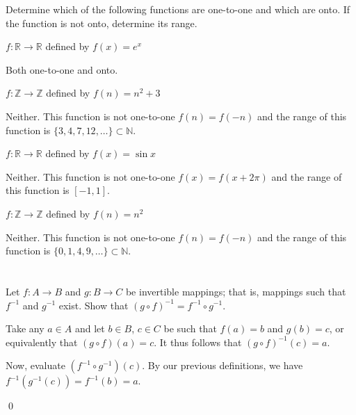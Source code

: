 Determine which of the following functions are one-to-one and which are onto. If the function is not onto, determine its range.
\hr
\begin{exlist}
    \item $f : \mathbb{R} \rightarrow \mathbb{R}$ defined by $f(x) = e^x$

    \medskip

    Both one-to-one and onto.

    \item $f : \mathbb{Z} \rightarrow \mathbb{Z}$ defined by $f(n) = n^2 + 3$

    \medskip

    Neither. This function is not one-to-one \emdash $f(n) = f(-n)$ \emdash and the range of this function is $\{3, 4, 7, 12, \dots\} \subset \mathbb{N}$.

    \item $f : \mathbb{R} \rightarrow \mathbb{R}$ defined by $f(x) = \sin x$

    \medskip

    Neither. This function is not one-to-one \emdash $f(x) = f(x + 2\pi)$ \emdash and the range of this function is $[-1, 1]$.

    \item $f : \mathbb{Z} \rightarrow \mathbb{Z}$ defined by $f(n) = n^2$

    \medskip

    Neither. This function is not one-to-one \emdash $f(n) = f(-n)$ \emdash and the range of this function is $\{0, 1, 4, 9, \dots\} \subset \mathbb{N}$.
\end{exlist}
\pagebreak
\section{}\label{sec:19}

Let $f: A \rightarrow B$ and $g: B \rightarrow C$ be invertible mappings; that is, mappings such that $f^{-1}$ and $g^{-1}$ exist.
Show that $(g \circ f)^{-1} = f^{-1} \circ g^{-1}$.
\hr

Take any $a \in A$ and let $b \in B$, $c \in C$ be such that $f(a) = b$ and $g(b) = c$, or equivalently that $(g \circ f)(a) = c$. It thus follows that $(g \circ f)^{-1}(c) = a.$

Now, evaluate $(f^{-1} \circ g^{-1})(c)$. By our previous definitions, we have $f^{-1}(g^{-1}(c)) = f^{-1}(b) = a$.

\qed

\section{}\label{sec:20}

